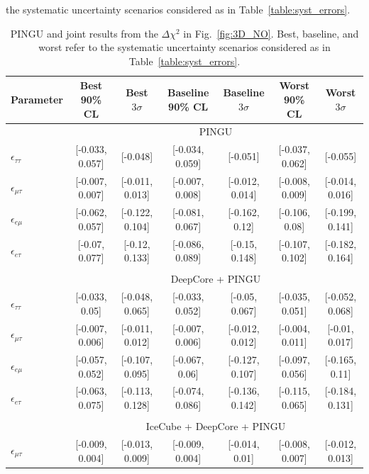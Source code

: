 \documentclass[draft=True]{revtex4-2}
\begin{document}
{{\begin{table}
{   the systematic uncertainty scenarios considered as in Table~\ref{table:syst_errors}.}\label{table:IC_DC_results}
\end{table}
\begin{table}
   \begin{tabular}{lcccccc}
      \hline \hline
      Parameter & Best 90\% CL & Best $3\sigma$& Baseline 90\% CL & Baseline $3\sigma$ & Worst 90\% CL & Worst $3\sigma$\\
      \hline & \multicolumn{6}{c}{PINGU} \\
      $\epsilon_{\tau\tau}$ &  [-0.033, 0.057] &         [-0.048] &  [-0.034, 0.059] &         [-0.051] &  [-0.037, 0.062] &         [-0.055] \\
      $\epsilon_{\mu\tau}$  &  [-0.007, 0.007] &  [-0.011, 0.013] &  [-0.007, 0.008] &  [-0.012, 0.014] &  [-0.008, 0.009] &  [-0.014, 0.016] \\
      $\epsilon_{e\mu}$     &  [-0.062, 0.057] &  [-0.122, 0.104] &  [-0.081, 0.067] &   [-0.162, 0.12] &   [-0.106, 0.08] &  [-0.199, 0.141] \\
      $\epsilon_{e\tau}$    &   [-0.07, 0.077] &   [-0.12, 0.133] &  [-0.086, 0.089] &   [-0.15, 0.148] &  [-0.107, 0.102] &  [-0.182, 0.164] \\\\
      & \multicolumn{6}{c}{DeepCore + PINGU} \\
      $\epsilon_{\tau\tau}$ &   [-0.033, 0.05] &  [-0.048, 0.065] &  [-0.033, 0.052] &   [-0.05, 0.067] &  [-0.035, 0.051] &  [-0.052, 0.068] \\
      $\epsilon_{\mu\tau}$  &  [-0.007, 0.006] &  [-0.011, 0.012] &  [-0.007, 0.006] &  [-0.012, 0.012] &  [-0.004, 0.011] &   [-0.01, 0.017] \\
      $\epsilon_{e\mu}$     &  [-0.057, 0.052] &  [-0.107, 0.095] &   [-0.067, 0.06] &  [-0.127, 0.107] &  [-0.097, 0.056] &   [-0.165, 0.11] \\
      $\epsilon_{e\tau}$    &  [-0.063, 0.075] &  [-0.113, 0.128] &  [-0.074, 0.086] &  [-0.136, 0.142] &  [-0.115, 0.065] &  [-0.184, 0.131] \\\\
      & \multicolumn{6}{c}{IceCube + DeepCore + PINGU}  \\
      $\epsilon_{\mu\tau}$  &  [-0.009, 0.004] &  [-0.013, 0.009] &  [-0.009, 0.004] &   [-0.014, 0.01] &  [-0.008, 0.007] &  [-0.012, 0.013] \\
      \hline
      \hline
   \end{tabular}
   \caption{PINGU and joint results from the $\Delta \chi^2$ in Fig.~\ref{fig:3D_NO}. Best, baseline, and worst refer to 
   the systematic uncertainty scenarios considered as in Table~\ref{table:syst_errors}.}\label{table:PINGU_joint_results}
\end{table}

}}
\end{document}
